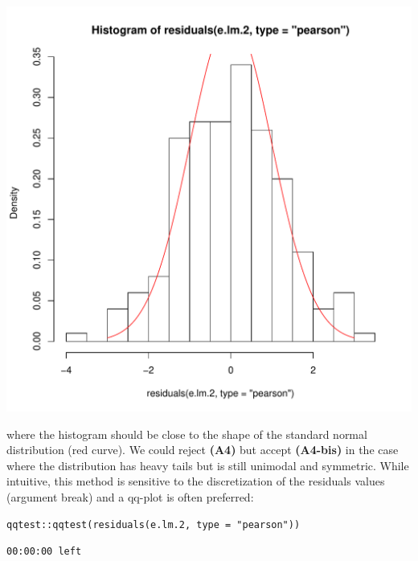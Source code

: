 \documentclass[12pt]{article}
\begin{document}
\begin{center}
\includegraphics[width=.9\linewidth]{./figures/A4-hist-res.pdf}
\end{center}

where the histogram should be close to the shape of the standard
normal distribution (red curve). We could reject \textbf{(A4)} but accept
\textbf{(A4-bis)} in the case where the distribution has heavy tails but is
still unimodal and symmetric. While intuitive, this method is
sensitive to the discretization of the residuals values (argument
break) and a qq-plot is often preferred:
\lstset{language=r,label= ,caption= ,captionpos=b,numbers=none}
\begin{lstlisting}
qqtest::qqtest(residuals(e.lm.2, type = "pearson"))
\end{lstlisting}

\begin{verbatim}
00:00:00 left
\end{verbatim}
\end{document}
